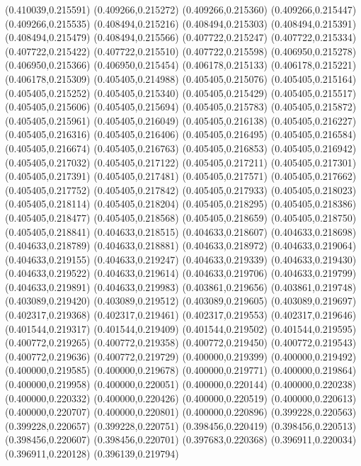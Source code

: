 (0.410039,0.215591)
(0.409266,0.215272)
(0.409266,0.215360)
(0.409266,0.215447)
(0.409266,0.215535)
(0.408494,0.215216)
(0.408494,0.215303)
(0.408494,0.215391)
(0.408494,0.215479)
(0.408494,0.215566)
(0.407722,0.215247)
(0.407722,0.215334)
(0.407722,0.215422)
(0.407722,0.215510)
(0.407722,0.215598)
(0.406950,0.215278)
(0.406950,0.215366)
(0.406950,0.215454)
(0.406178,0.215133)
(0.406178,0.215221)
(0.406178,0.215309)
(0.405405,0.214988)
(0.405405,0.215076)
(0.405405,0.215164)
(0.405405,0.215252)
(0.405405,0.215340)
(0.405405,0.215429)
(0.405405,0.215517)
(0.405405,0.215606)
(0.405405,0.215694)
(0.405405,0.215783)
(0.405405,0.215872)
(0.405405,0.215961)
(0.405405,0.216049)
(0.405405,0.216138)
(0.405405,0.216227)
(0.405405,0.216316)
(0.405405,0.216406)
(0.405405,0.216495)
(0.405405,0.216584)
(0.405405,0.216674)
(0.405405,0.216763)
(0.405405,0.216853)
(0.405405,0.216942)
(0.405405,0.217032)
(0.405405,0.217122)
(0.405405,0.217211)
(0.405405,0.217301)
(0.405405,0.217391)
(0.405405,0.217481)
(0.405405,0.217571)
(0.405405,0.217662)
(0.405405,0.217752)
(0.405405,0.217842)
(0.405405,0.217933)
(0.405405,0.218023)
(0.405405,0.218114)
(0.405405,0.218204)
(0.405405,0.218295)
(0.405405,0.218386)
(0.405405,0.218477)
(0.405405,0.218568)
(0.405405,0.218659)
(0.405405,0.218750)
(0.405405,0.218841)
(0.404633,0.218515)
(0.404633,0.218607)
(0.404633,0.218698)
(0.404633,0.218789)
(0.404633,0.218881)
(0.404633,0.218972)
(0.404633,0.219064)
(0.404633,0.219155)
(0.404633,0.219247)
(0.404633,0.219339)
(0.404633,0.219430)
(0.404633,0.219522)
(0.404633,0.219614)
(0.404633,0.219706)
(0.404633,0.219799)
(0.404633,0.219891)
(0.404633,0.219983)
(0.403861,0.219656)
(0.403861,0.219748)
(0.403089,0.219420)
(0.403089,0.219512)
(0.403089,0.219605)
(0.403089,0.219697)
(0.402317,0.219368)
(0.402317,0.219461)
(0.402317,0.219553)
(0.402317,0.219646)
(0.401544,0.219317)
(0.401544,0.219409)
(0.401544,0.219502)
(0.401544,0.219595)
(0.400772,0.219265)
(0.400772,0.219358)
(0.400772,0.219450)
(0.400772,0.219543)
(0.400772,0.219636)
(0.400772,0.219729)
(0.400000,0.219399)
(0.400000,0.219492)
(0.400000,0.219585)
(0.400000,0.219678)
(0.400000,0.219771)
(0.400000,0.219864)
(0.400000,0.219958)
(0.400000,0.220051)
(0.400000,0.220144)
(0.400000,0.220238)
(0.400000,0.220332)
(0.400000,0.220426)
(0.400000,0.220519)
(0.400000,0.220613)
(0.400000,0.220707)
(0.400000,0.220801)
(0.400000,0.220896)
(0.399228,0.220563)
(0.399228,0.220657)
(0.399228,0.220751)
(0.398456,0.220419)
(0.398456,0.220513)
(0.398456,0.220607)
(0.398456,0.220701)
(0.397683,0.220368)
(0.396911,0.220034)
(0.396911,0.220128)
(0.396139,0.219794)
